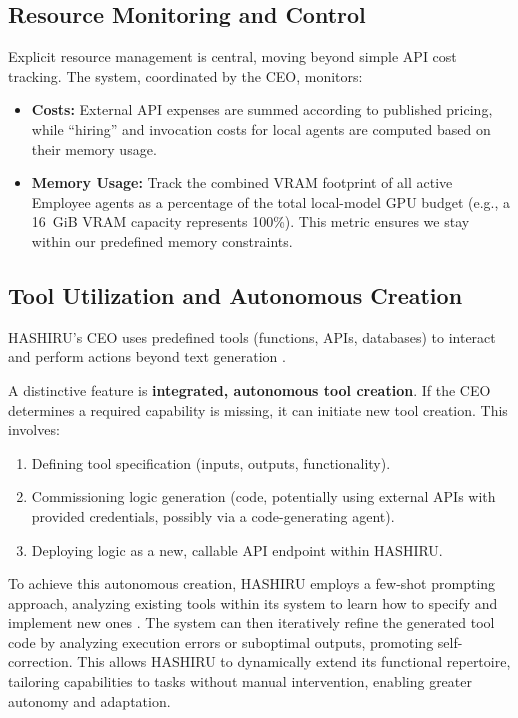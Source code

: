 \documentclass[conference]{IEEEtran}
\begin{document}
\subsection{Resource Monitoring and Control}
\label{subsec:resource_mgmt}
Explicit resource management is central, moving beyond simple API cost tracking. The system, coordinated by the CEO, monitors:
\begin{itemize}
    \item \textbf{Costs:} External API expenses are summed according to published pricing, while ``hiring'' and invocation costs for local agents are computed based on their memory usage.
    \item \textbf{Memory Usage:} Track the combined VRAM footprint of all active Employee agents as a percentage of the total local-model GPU budget (e.g., a 16~GiB VRAM capacity represents 100\%). This metric ensures we stay within our predefined memory constraints.
\end{itemize}
\subsection{Tool Utilization and Autonomous Creation}
\label{subsec:tooling}
HASHIRU's CEO uses predefined tools (functions, APIs, databases) to interact and perform actions beyond text generation \cite{yao2022react, openai_func_calling}.

A distinctive feature is \textbf{integrated, autonomous tool creation}. If the CEO determines a required capability is missing, it can initiate new tool creation. This involves:
\begin{enumerate}
    \item Defining tool specification (inputs, outputs, functionality).
    \item Commissioning logic generation (code, potentially using external APIs with provided credentials, possibly via a code-generating agent).
    \item Deploying logic as a new, callable API endpoint within HASHIRU.
\end{enumerate}
To achieve this autonomous creation, HASHIRU employs a few-shot prompting approach, analyzing existing tools within its system to learn how to specify and implement new ones \cite{brown2020language}. The system can then iteratively refine the generated tool code by analyzing execution errors or suboptimal outputs, promoting self-correction. This allows HASHIRU to dynamically extend its functional repertoire, tailoring capabilities to tasks without manual intervention, enabling greater autonomy and adaptation.
\end{document}
